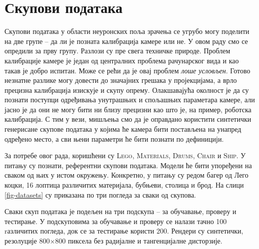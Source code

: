 \documentclass[12pt, a4paper, twoside]{book}
\numberwithin{equation}{chapter}
\numberwithin{theorem}{section}
\numberwithin{definition}{section}
\numberwithin{definitionChapter}{chapter}
\begin{document}
\chapter{Скупови података}
Скупови података у области неуронских поља зрачења се угрубо могу поделити на две групе -- да ли је позната
калибрација камере или не. У овом раду смо се опредили за прву групу. Разлози су  пре свега техничке природе.
Проблем калибрације камере је један од централних проблема рачунарског вида и као такав је добро испитан.
Може се рећи да је овај проблем \textit{лоше условљен}. Готово незнатне разлике могу довести до значајних грешака
у пројекцијама, а врло прецизна калибрација изискује и скупу опрему. Олакшавајућа околност је да су познати поступци
одређивања унутрашњих и спољашњих параметара камере, али јасно је да они не могу бити ни близу прецизни као што је,
на пример, роботска калибрација. С тим у вези, мишљења смо да је оправдано користити синтетички генерисане скупове
података у којима ће камера бити постављена на унапред одређено место, а сви њени параметри ће бити познати по дефиницији.

За потребе овог рада, коришћени су \textsc{Lego}, \textsc{Materials}, \textsc{Drums}, \textsc{Chair} и \textsc{Ship}.
У питању су познати, референтни скупови података. Модели ће бити упоређени на сваком од њих у истом окружењу.
Конкретно, у питању су редом багер од Лего коцки, 16 лоптица различитих материјала, бубњеви, столица и брод.
На слици \ref{fig-datasets} су приказана по три погледа за сваки од скупова.

Сваки скуп података је подељен на три подскупа -- за обучавање, проверу и тестирање. У подскуповима за обучавање и проверу
се налази тачно 100 rазличитих погледа, док се за тестирање користи 200. Рендери су синтетички, резолуције 800$\times$800
пиксела без радијалне и тангенцијалне дисторзије.
\end{document}

